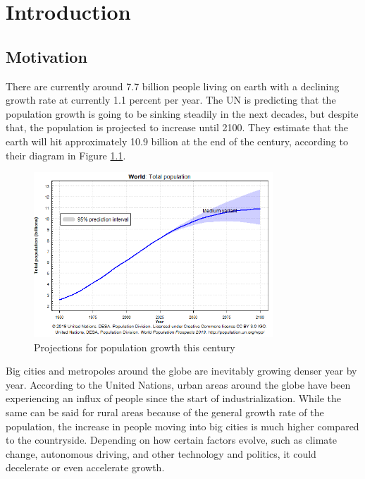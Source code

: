 
\chapter{Introduction}\label{chapter:introduction}
\section{Motivation}

There are currently around 7.7 billion people living on earth with a declining growth rate at currently 1.1 percent per year. The UN is predicting that the population growth is going to be sinking steadily in the next decades, but despite that, the population is projected to increase until 2100. They estimate that the earth will hit approximately 10.9 billion at the end of the century, according to their diagram in Figure \ref{fig:population}.

\begin{figure}[htpb]
  \centering
  \includegraphics[width=0.8\textwidth]{figures/population.png}
  \caption{Projections for population growth this century} \label{fig:population}
\end{figure}


Big cities and metropoles around the globe are inevitably growing denser year by year. According to the United Nations, urban areas around the globe have been experiencing an influx of people since the start of industrialization. While the same can be said for rural areas because of the general growth rate of the population, the increase in people moving into big cities is much higher compared to the countryside.
Depending on how certain factors evolve, such as climate change, autonomous driving, and other technology and politics, it could decelerate or even accelerate growth.

